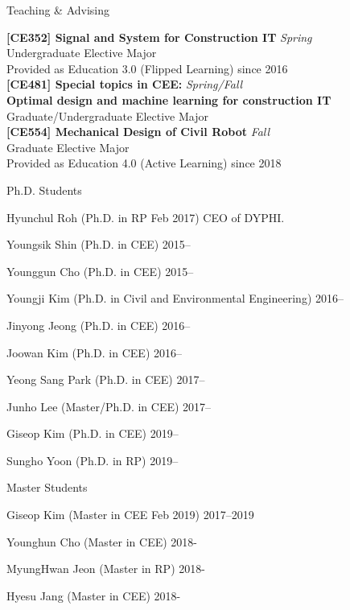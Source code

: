 \begin{rSection}{Teaching \& Advising}

{\bf[CE352] Signal and System for Construction IT} \hfill {\em Spring} \\
Undergraduate Elective Major \\
Provided as Education 3.0 (Flipped Learning) since 2016\\

{\bf[CE481] Special topics in CEE:} \hfill {\em Spring/Fall} \\
{\bf Optimal design and machine learning for construction IT}\\
Graduate/Undergraduate Elective Major \\

{\bf[CE554] Mechanical Design of Civil Robot } \hfill {\em Fall} \\
Graduate Elective Major \\
Provided as Education 4.0 (Active Learning) since 2018\\

\begin{rSubsection}{Ph.D. Students}{}{}{}
  \item Hyunchul Roh (Ph.D. in \acf{RP} Feb 2017) \hfill CEO of DYPHI.
  \item Youngsik Shin (Ph.D. in \acf{CEE}) \hfill 2015--
  \item Younggun Cho (Ph.D. in \ac{CEE}) \hfill 2015--
  \item Youngji Kim (Ph.D. in Civil and Environmental Engineering) \hfill 2016--
  \item Jinyong Jeong (Ph.D. in \ac{CEE}) \hfill 2016--
  \item Joowan Kim (Ph.D. in \ac{CEE}) \hfill 2016--
  \item Yeong Sang Park (Ph.D. in \ac{CEE}) \hfill 2017--
  \item Junho Lee (Master/Ph.D. in \ac{CEE}) \hfill 2017--
  \item Giseop Kim (Ph.D. in \ac{CEE}) \hfill 2019--
  \item Sungho Yoon (Ph.D. in \ac{RP}) \hfill 2019--
\end{rSubsection}

\begin{rSubsection}{Master Students}{}{}{}
  \item Giseop Kim (Master in \acf{CEE} Feb 2019) \hfill 2017--2019
  \item Younghun Cho (Master in \ac{CEE}) \hfill 2018-
  \item MyungHwan Jeon (Master in \ac{RP}) \hfill 2018-
  \item Hyesu Jang (Master in \ac{CEE}) \hfill 2018-
\end{rSubsection}


\end{rSection}
